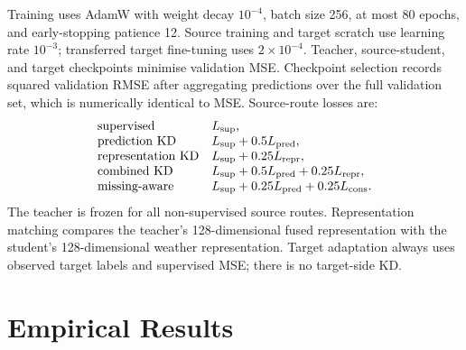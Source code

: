 \documentclass[runningheads]{venue/lncs/llncs}
\begin{document}
Training uses AdamW \cite{Loshchilov2019AdamW} with weight decay $10^{-4}$, batch size 256, at most 80 epochs, and early-stopping patience 12. Source training and target scratch use learning rate $10^{-3}$; transferred target fine-tuning uses $2\times10^{-4}$. Teacher, source-student, and target checkpoints minimise validation MSE. Checkpoint selection records squared validation RMSE after aggregating predictions over the full validation set, which is numerically identical to MSE. Source-route losses are:
\[
\begin{array}{ll}
\text{supervised} & L_{\rm sup},\\
\text{prediction KD} & L_{\rm sup}+0.5L_{\rm pred},\\
\text{representation KD} & L_{\rm sup}+0.25L_{\rm repr},\\
\text{combined KD} & L_{\rm sup}+0.5L_{\rm pred}+0.25L_{\rm repr},\\
\text{missing-aware} & L_{\rm sup}+0.25L_{\rm pred}+0.25L_{\rm cons}.
\end{array}
\]
The teacher is frozen for all non-supervised source routes. Representation matching compares the teacher's 128-dimensional fused representation with the student's 128-dimensional weather representation. Target adaptation always uses observed target labels and supervised MSE; there is no target-side KD.

\section{Empirical Results}
\end{document}
